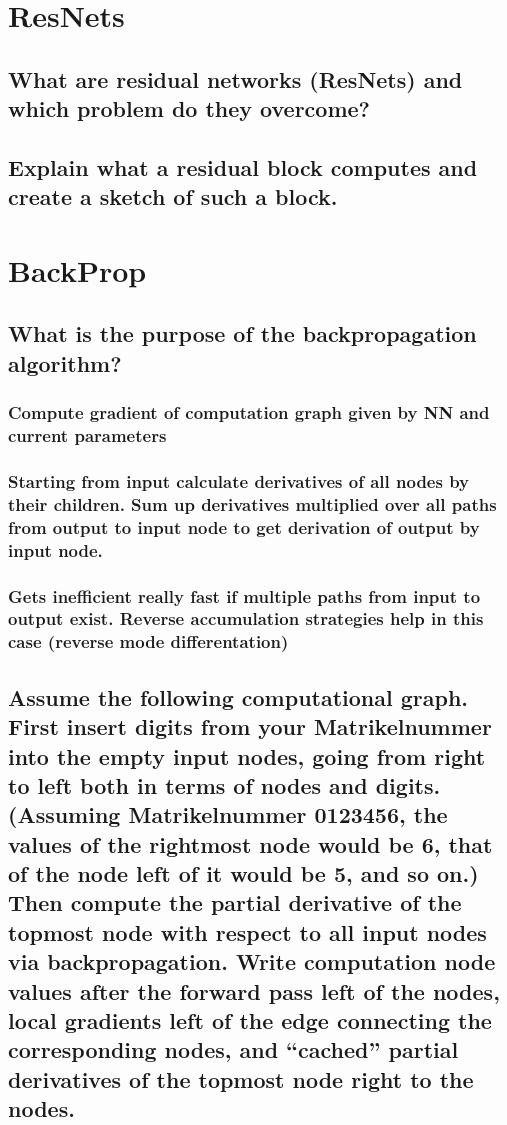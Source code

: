 \section{ResNets}
\subsection{What are residual networks (ResNets) and which problem do they overcome?}
\subsection{Explain what a residual block computes and create a sketch of such a block.}

\section{BackProp}
\subsection{What is the purpose of the backpropagation algorithm?}
\subsubsection{ Compute gradient of computation graph given by NN and current parameters}
\subsubsection{ Starting from input calculate derivatives of all nodes by their children. Sum up derivatives multiplied over all paths from output to input node to get derivation of output by input node. }
\subsubsection{ Gets inefficient really fast if multiple paths from input to output exist. Reverse accumulation strategies help in this case (reverse mode differentation)}
\subsection{Assume the following computational graph. First insert digits from your Matrikelnummer into the empty input nodes, going from right to left both in terms of nodes and digits. (Assuming Matrikelnummer 0123456, the values of the rightmost node would be 6, that of the node left of it would be 5, and so on.) Then compute the partial derivative of the topmost node with respect to all input nodes via  backpropagation. Write computation node values after the forward pass left of the nodes, local gradients left of the edge connecting the corresponding nodes, and “cached” partial derivatives of the topmost node right to the nodes.}
